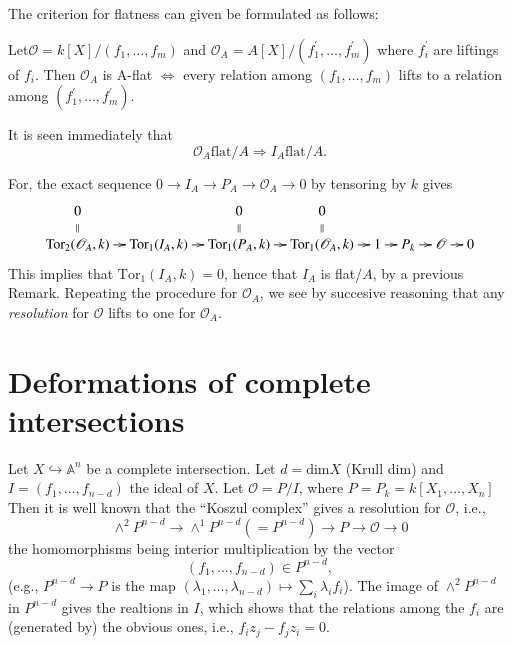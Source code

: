 {The criterion for flatness can given be formulated as follows:

\begin{coro*}
Let\pageoriginale $\mathscr{O}=k[X]/(f_1,\ldots,f_m)$ and $\mathscr{O}_A=A[X]/(f^{'}_1,\ldots,f^{'}_m)$ where $f^{'}_i$ are liftings of $f_i$. Then
$\mathscr{O}_A$ is A-flat $\Leftrightarrow$ every relation among $(f_1,\ldots,f_m)$ lifts to a relation among $(f^{'}_1,\ldots,f^{'}_m)$.
\end{coro*}

\begin{remark}\label{part1-rem3.1}%
It is seen immediately that
$$
\mathscr{O}_A\text{flat}/A\Rightarrow I_A \text{flat}/A.
$$

For, the exact sequence $0\rightarrow I_A \rightarrow
P_A \rightarrow \mathscr{O}_A\rightarrow 0$ by tensoring by $k$ gives 
{\fontsize{10}{12}\selectfont
\begin{equation*}
\xymatrix@R=0.8pc@C=0.7pc{
0\ar @{} [d]|{\parallel} & & 0 \ar @{} [d]|{\parallel} & 0 \ar @{} [d]|{\parallel}\\
\text{Tor}_2(\mathscr{O}_A, k)\ar[r]& \text{Tor}_1(I_A, k)\ar[r]
& \text{Tor}_1(P_A, k)\ar[r]& \text{Tor}_1(\mathscr{O}_A, k)\ar[r]
&1 \ar[r]& P_k\ar[r]&\mathscr{O}\ar[r]& 0} 
\end{equation*}}\relax
This implies that $\text{Tor}_1(I_A, k)=0$, hence that $I_A$ is
flat/$A$, by a previous Remark. Repeating the procedure for
$\mathscr{O}_A$, we see by succesive reasoning that any {\em
resolution} for $\mathscr{O}$ lifts to one for $\mathscr{O}_A$. 
\end{remark}


\section{Deformations of complete intersections}\label{part1-sec4}

Let $X\hookrightarrow \mathbb{A}^{n}$ be a complete intersection. Let $d=\text{dim} X$ (Krull dim) and $I=(f_1,\ldots,f_{n-d})$ the ideal of $X$. Let $\mathscr{O}=P/I$, where $P=P_k=k[X_1,\ldots,X_n]$ Then it is well known that the ``Koszul complex'' gives a resolution for $\mathscr{O}$, i.e.,
$$
\displaystyle\mathop\wedge^{2}P^{n-d}\rightarrow \displaystyle\mathop\wedge^{1}P^{n-d}(=P^{n-d})\rightarrow
P \rightarrow \mathscr{O}\rightarrow 0 
$$
the homomorphisms being interior multiplication by the vector\pageoriginale 
$$
(f_1,\ldots,f_{n-d})\in P^{n-d},
$$ 
(e.g., $P^{n-d}\rightarrow P$ is the map
$(\lambda_1,\ldots,\lambda_{n-d})\mapsto\sum_i\lambda_if_i$). The
image of $\displaystyle\mathop\wedge^{2}P^{n-d}$ in $P^{n-d}$ gives
the realtions in $I$, which shows that the relations among the $f_i$
are (generated by) the obvious ones, i.e., $f_i z_j-f_jz_i=0$. 

}
